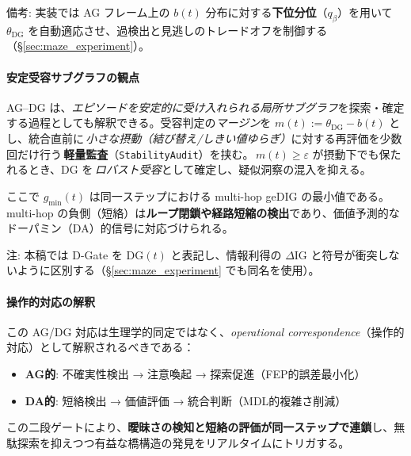 \documentclass[ja=standard,xelatex]{bxjsarticle}
\begin{document}
\noindent 備考: 実装では AG フレーム上の $b(t)$ 分布に対する\textbf{下位分位}（$q_\beta$）を用いて $\theta_{\mathrm{DG}}$ を自動適応させ、過検出と見逃しのトレードオフを制御する（\S\ref{sec:maze_experiment}）。

\paragraph{安定受容サブグラフの観点}
AG–DG は、\emph{エピソードを安定的に受け入れられる局所サブグラフ}を探索・確定する過程としても解釈できる。受容判定の\emph{マージン}を $m(t):=\theta_{\mathrm{DG}}-b(t)$ とし、統合直前に\,\emph{小さな摂動（結び替え/しきい値ゆらぎ）}に対する再評価を少数回だけ行う\,\textbf{軽量監査}（\texttt{StabilityAudit}）を挟む。\,$m(t)\ge \varepsilon$ が摂動下でも保たれるとき、DG を\,\emph{ロバスト受容}として確定し、疑似洞察の混入を抑える。

ここで $g_{\min}(t)$ は同一ステップにおける multi-hop geDIG の最小値である。multi-hop の負側（短絡）は\textbf{ループ閉鎖や経路短縮の検出}であり、価値予測的なドーパミン（DA）的信号に対応づけられる。

\noindent 注: 本稿では D-Gate を $\mathrm{DG}(t)$ と表記し、情報利得の $\Delta\mathrm{IG}$ と符号が衝突しないように区別する（\S\ref{sec:maze_experiment} でも同名を使用）。

\paragraph{操作的対応の解釈}
この AG/DG 対応は生理学的同定ではなく、\emph{operational correspondence}（操作的対応）として解釈されるべきである：
\begin{itemize}
  \item \textbf{AG的}: 不確実性検出 → 注意喚起 → 探索促進（FEP的誤差最小化）
  \item \textbf{DA的}: 短絡検出 → 価値評価 → 統合判断（MDL的複雑さ削減）
\end{itemize}

この二段ゲートにより、\textbf{曖昧さの検知と短絡の評価が同一ステップで連鎖}し、無駄探索を抑えつつ有益な橋構造の発見をリアルタイムにトリガする。
\end{document}
